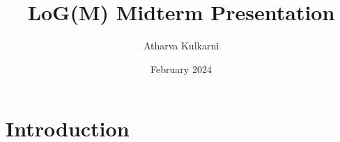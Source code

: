 \documentclass{article}
\title{LoG(M) Midterm Presentation}
\author{Atharva Kulkarni}
\date{February 2024}
\begin{document}
\maketitle

\section{Introduction}
\end{document}
